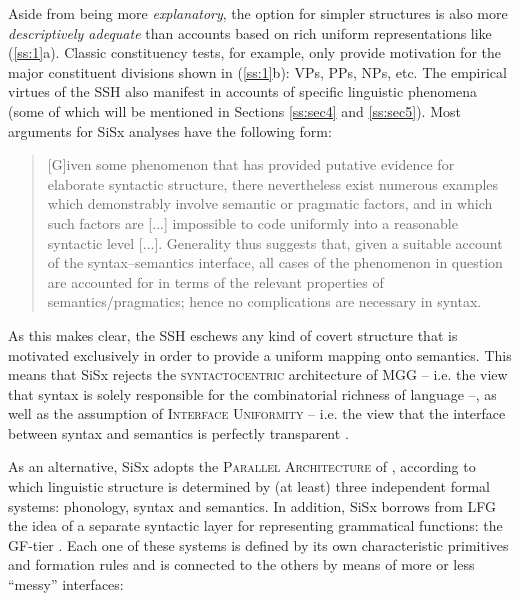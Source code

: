 \documentclass[output=paper,hidelinks]{langscibook}
\begin{document}


Aside from being more \textit{explanatory}, the option for simpler structures is also more \textit{descriptively adequate} than accounts based on rich uniform representations like (\ref{ss:1}a). Classic constituency tests, for example, only provide motivation for the major constituent divisions shown in (\ref{ss:1}b): VPs, PPs, NPs, etc. The empirical virtues of the SSH also manifest in accounts of specific linguistic phenomena (some of which will be mentioned in Sections \ref{ss:sec4} and \ref{ss:sec5}). Most arguments for SiSx analyses have the following form:



\begin{quote}
[G]iven some phenomenon that has provided putative evidence for elaborate syntactic structure, there nevertheless exist numerous examples which demonstrably involve semantic or pragmatic factors, and in which such factors are [...] impossible to code uniformly into a reasonable syntactic level [...]. Generality thus suggests that, given a suitable account of the syntax–semantics interface, all cases of the phenomenon in question are accounted for in terms of the relevant properties of semantics/pragmatics; hence no complications are necessary in syntax. \citep[5]{culicover2005simpler}
\end{quote}




As this makes clear, the SSH eschews any kind of covert structure that is motivated exclusively in order to provide a uniform mapping onto semantics. This means that SiSx rejects the \textsc{syntactocentric} architecture of MGG -- i.e. the view that syntax is solely responsible for the combinatorial richness of language \citep[17]{culicover2005simpler} --, as well as the assumption of  \textsc{Interface Uniformity} -- i.e. the view that the interface between syntax and semantics is perfectly transparent \citep[47]{culicover2005simpler}.

\hspace*{-4.1pt}As an alternative, SiSx adopts the \textsc{Parallel Architecture} of \citet{jackendoff2002foundations}, according to which linguistic structure is determined by (at least) three independent formal systems: phonology, syntax and semantics. In addition, SiSx borrows from LFG the idea of a separate syntactic layer for representing grammatical functions: the GF-tier \citep[chapter~6]{culicover2005simpler}. Each one of these systems is defined by its own characteristic primitives and formation rules and is connected to the others by means of more or less ``messy'' interfaces:
\end{document}
